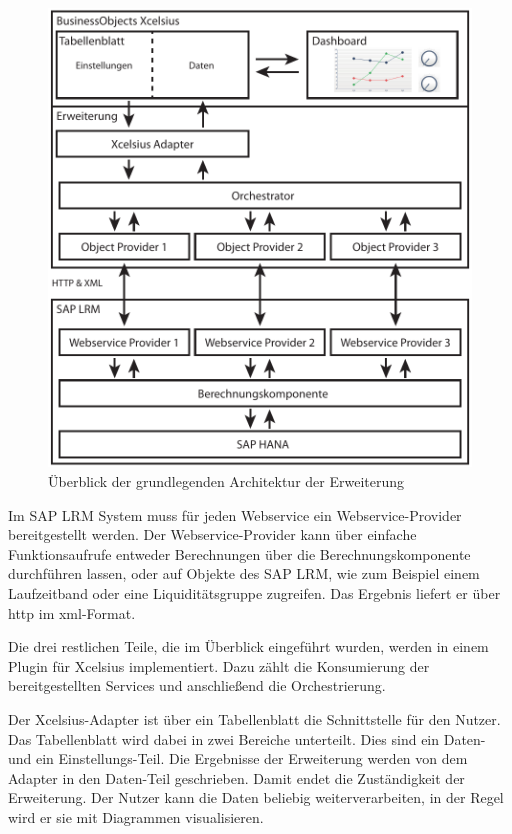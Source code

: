 \begin{onehalfspacing}
\begin{figure}[!ht]
\centering
\setlength{\unitlength}{1mm}
\includegraphics[width=15cm]{images/Abbildung11-Architektur-Erweiterung.pdf}
\caption{Überblick der grundlegenden Architektur der Erweiterung\label{fig:ueberblick-architektur}}
\end{figure}

Im SAP LRM System muss für jeden Webservice ein Webservice-Provider bereitgestellt werden. Der Webservice-Provider kann über einfache Funktionsaufrufe entweder Berechnungen über die Berechnungskomponente durchführen lassen, oder auf Objekte des SAP LRM, wie zum Beispiel einem Laufzeitband oder eine Liquiditätsgruppe zugreifen. Das Ergebnis liefert er über \gls{http} im \gls{xml}-Format.

Die drei restlichen Teile, die im Überblick eingeführt wurden, werden in einem Plugin für \gls{Xcelsius} implementiert. Dazu zählt die Konsumierung der bereitgestellten Services und anschließend die Orchestrierung.

Der \gls{Xcelsius}-Adapter ist über ein Tabellenblatt die Schnittstelle für den Nutzer. Das Tabellenblatt wird dabei in zwei Bereiche unterteilt. Dies sind ein Daten- und ein Ein\-stel\-lungs-Teil. Die Ergebnisse der Erweiterung werden von dem Adapter in den Daten-Teil geschrieben. Damit endet die Zuständigkeit der Erweiterung. Der Nutzer kann die Daten beliebig weiterverarbeiten, in der Regel wird er sie mit Diagrammen visualisieren.


\end{onehalfspacing}
